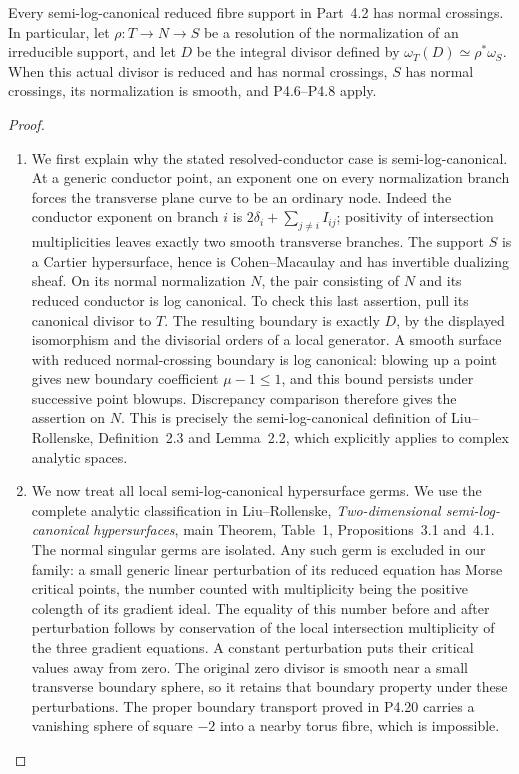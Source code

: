\begin{proposition}[P4.25]\hypertarget{tag-02WX}{}\label{night:P4.25}\label{stmt:P4.25}

Every semi-log-canonical reduced fibre support in
Part~4.2 has normal crossings. In particular, let
$\rho:T\to N\to S$ be a resolution of the normalization
of an irreducible support, and let $D$ be the integral
divisor defined by
$\omega_T(D)\simeq\rho^*\omega_S$. When this actual
divisor is reduced and has normal crossings, $S$
has normal crossings, its normalization is smooth,
and P4.6--P4.8 apply.
\end{proposition}
\begin{proof}

\begin{enumerate}[label={$\langle1\rangle$\arabic*.},leftmargin=*]
\item We first explain why the stated resolved-conductor
case is semi-log-canonical. At a generic conductor
point, an exponent one on every normalization
branch forces the transverse plane curve to be an
ordinary node. Indeed the conductor exponent on
branch $i$ is
$2\delta_i+\sum_{j\ne i}I_{ij}$; positivity of
intersection multiplicities leaves exactly two
smooth transverse branches. The support $S$ is a
Cartier hypersurface, hence is Cohen--Macaulay and
has invertible dualizing sheaf. On its normal
normalization $N$, the pair consisting of $N$
and its reduced conductor is log canonical.
To check this last assertion, pull its canonical
divisor to $T$. The resulting boundary is exactly
$D$, by the displayed isomorphism and the
divisorial orders of a local generator. A smooth
surface with reduced normal-crossing boundary is
log canonical: blowing up a point gives new
boundary coefficient $\mu-1\le1$, and this
bound persists under successive point blowups.
Discrepancy comparison therefore gives the
assertion on $N$. This is precisely the
semi-log-canonical definition of
Liu--Rollenske, Definition~2.3 and Lemma~2.2,
which explicitly applies to complex analytic
spaces.

\item We now treat all local semi-log-canonical
hypersurface germs. We use the complete analytic
classification in Liu--Rollenske,
\emph{Two-dimensional semi-log-canonical
hypersurfaces}, main Theorem, Table~1,
Propositions~3.1 and~4.1. The normal singular
germs are isolated. Any such germ is excluded
in our family: a small generic linear
perturbation of its reduced equation has
Morse critical points, the number counted
with multiplicity being the positive
colength of its gradient ideal. The equality
of this number before and after perturbation
follows by conservation of the local
intersection multiplicity of the three
gradient equations. A constant perturbation
puts their critical values away from zero.
The original zero divisor is smooth near
a small transverse boundary sphere, so it
retains that boundary property under these
perturbations. The proper boundary
transport proved in P4.20 carries a
vanishing sphere of square $-2$ into a
nearby torus fibre, which is impossible.


\end{enumerate}
\end{proof}
